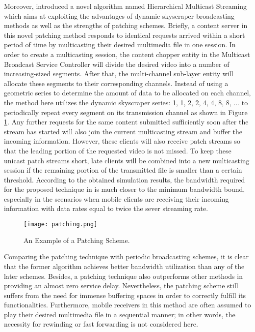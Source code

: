 Moreover, \cite{ref21} introduced a novel algorithm named Hierarchical Multicast Streaming which aims at exploiting the advantages of dynamic skyscraper broadcasting methods as well as the strengths of patching schemes. Briefly, a content server in this novel patching method responds to identical requests arrived within a short period of time by multicasting their desired multimedia file in one session. In order to create a multicasting session, the content chopper entity in the Multicast Broadcast Service Controller will divide the desired video into a number of increasing-sized segments. After that, the multi-channel sub-layer entity will allocate these segments to their corresponding channels. Instead of using a geometric series to determine the amount of data to be allocated on each channel, the method here utilizes the dynamic skyscraper series: {1, 1, 2, 2, 4, 4, 8, 8, ... } to periodically repeat every segment on its transmission channel as shown in Figure \ref{patching}. Any further requests for the same content submitted sufficiently soon after the stream has started will also join the current multicasting stream and buffer the incoming information. However, these clients will also receive patch streams so that the leading portion of the requested video is not missed. To keep these unicast patch streams short, late clients will be combined into a new multicasting session if the remaining portion of the transmitted file is smaller than a certain threshold. According to the obtained simulation results, the bandwidth required for the proposed technique in \cite{ref21} is much closer to the minimum bandwidth bound, especially in the scenarios when mobile clients are receiving their incoming information with data rates equal to twice the sever streaming rate. 

\begin{figure}[!t]
\centering
\texttt{[image: patching.png]}
\caption{An Example of a Patching Scheme.}
\label{patching}
\end{figure}

Comparing the patching technique with periodic broadcasting schemes, it is clear that the former algorithm achieves better bandwidth utilization than any of the later schemes. Besides, a patching technique also outperforms other methods in providing an almost zero service delay. Nevertheless, the patching scheme still suffers from the need for immense buffering spaces in order to correctly fulfill its functionalities. Furthermore, mobile receivers in this method are often assumed to play their desired multimedia file in a sequential manner; in other words, the necessity for rewinding or fast forwarding is not considered here.

